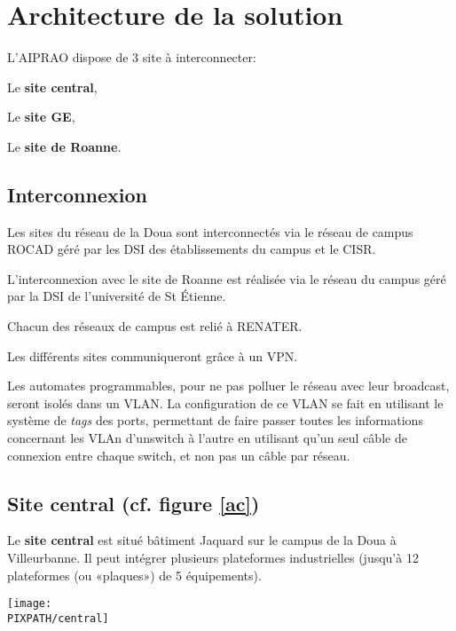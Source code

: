 \section{Architecture de la solution}

L'AIPRAO dispose de 3 site à interconnecter:
\begin{description}
\item Le {\bf site central},
\item Le {\bf site GE},
\item Le {\bf site de Roanne}.
\end{description}

\subsection{Interconnexion}

Les sites du réseau de la Doua sont interconnectés via le réseau de campus
ROCAD géré par les DSI des établissements du campus et le CISR.

L'interconnexion avec le site de Roanne est réalisée via le réseau du campus
géré par la DSI de l'université de St Étienne.

Chacun des réseaux de campus est relié à RENATER. 

Les différents sites communiqueront grâce à un VPN.

Les automates programmables, pour ne pas polluer le réseau avec leur
broadcast, seront isolés dans un VLAN. La configuration de ce VLAN
se fait en utilisant le système de {\sl tags} des ports, permettant
de faire passer toutes les informations concernant les VLAn d'unswitch
à l'autre en utilisant qu'un seul câble de connexion entre chaque switch,
et non pas un câble par réseau.

\subsection{Site central (cf. figure \ref{ac})}

Le {\bf site central} est situé bâtiment Jaquard sur le campus
        de la Doua à Villeurbanne. Il peut intégrer plusieurs plateformes 
        industrielles (jusqu'à 12 plateformes (ou «plaques») de 5 équipements).

\begin{center}
\begin{sidewaysfigure}[!h]
    \texttt{[image: \\PIXPATH/central]}
    \caption{Architecture du site central}
    \label{ac}
\end{sidewaysfigure}
\end{center}


